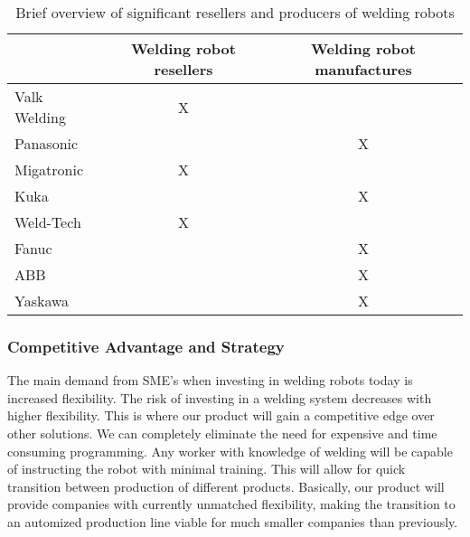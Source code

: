 \begin{table}[h]
\centering
\begin{tabular}{|l|c|c|}
\hline
             & Welding robot resellers & Welding robot manufactures \\ 
\hline
Valk Welding & X                       &   \\ \hline
Panasonic    &                         & X \\ \hline
Migatronic   & X                       &   \\ \hline
Kuka         &                         & X \\ \hline
Weld-Tech    & X                       &   \\ \hline                              
Fanuc        &                         & X \\ \hline                                 
ABB          &                         & X \\ \hline                                 
Yaskawa      &                         & X \\ \hline
\end{tabular} 
\caption{Brief overview of significant resellers and producers of welding robots}
\label{Tablecompetitors}
\end{table}

\subsubsection{Competitive Advantage and Strategy}
The main demand from SME's when investing in welding robots today is increased flexibility.
 The risk of investing in a welding system decreases with higher flexibility. This is where our product will gain a competitive edge over other solutions. 
 We can completely eliminate the need for expensive and time consuming programming. Any worker with knowledge of welding will be capable of instructing the robot with minimal training. This will allow for quick transition between production of different products. Basically, our product will provide companies with currently unmatched flexibility, making the transition to an automized production line viable for much smaller companies than previously.